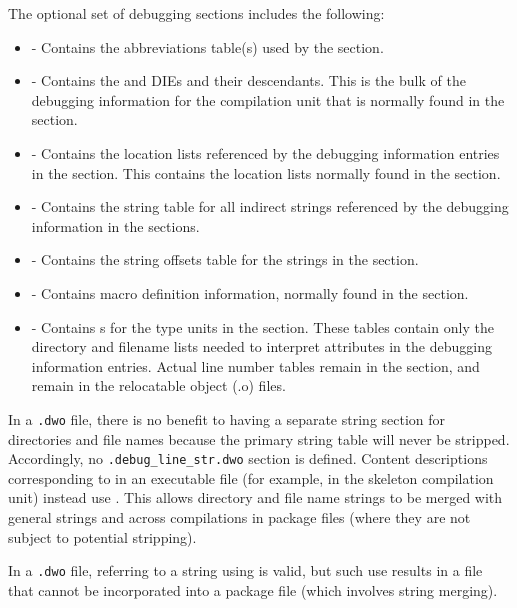 The optional set of debugging sections includes the following:
\begin{itemize}
\item
\dotdebugabbrevdwo{} - Contains the abbreviations table(s) used by
the \dotdebuginfodwo{} section.
\item
\dotdebuginfodwo{} - Contains the \DWTAGcompileunit{} and
\DWTAGtypeunit{} DIEs and
their descendants. This is the bulk of the debugging
information for the compilation unit that is normally found
in the \dotdebuginfo{} section.
\item
\dotdebugloclistsdwo{} - Contains the location lists referenced by
the debugging information entries in the \dotdebuginfodwo{}
section. This contains the location lists normally found in 
the \dotdebugloclists{} section.
\item
\dotdebugstrdwo{} - Contains the string table for all indirect
strings referenced by the debugging information in the
\dotdebuginfodwo{} sections.
\item
\dotdebugstroffsetsdwo{} - Contains the string offsets table
for the strings in the \dotdebugstrdwo{}{} section.
\item
\dotdebugmacrodwo{} - Contains macro definition information,
normally found in the \dotdebugmacro{} section.
\item
\dotdebuglinedwo{} - Contains s 
for the type units in the \dotdebuginfodwo{} section. These tables
contain only the directory and filename lists needed to
interpret \DWATdeclfile{} attributes in the debugging
information entries. Actual line number tables remain in the
\dotdebugline{} section, and remain in the relocatable object
(.o) files.

\end{itemize}

In a \texttt{.dwo} file, there is no benefit to having a separate string
section for directories and file names because the primary
string table will never be stripped. Accordingly, no
\texttt{.debug\_line\_str.dwo} section is defined. Content descriptions 
corresponding to \DWFORMlinestrp{} in an executable file (for example, 
in the skeleton compilation unit) instead use \DWFORMstrx. This allows
directory and file name strings to be merged with general
strings and across compilations in package files 
(where they are not subject to potential stripping).

In a \texttt{.dwo} file, referring to a string using \DWFORMstrp{}
is valid, but such use 
results in a file that cannot be incorporated into a package file
(which involves string merging).

